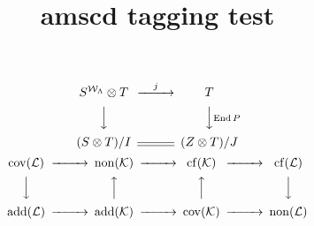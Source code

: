 \documentclass{article}
\title{amscd tagging test}
\DeclareMathOperator{\End}{End}
\DeclareMathOperator{\cov}{cov}
\DeclareMathOperator{\cf}{cf}
\DeclareMathOperator{\add}{add}
\DeclareMathOperator{\non}{non}
\begin{document}
\begin{equation}
\begin{CD}
S^{{\mathcal{W}}_\Lambda}\otimes T @>j>> T\\
@VVV @VV{\End P}V\\
(S\otimes T)/I @= (Z\otimes T)/J
\end{CD}
\end{equation}
\begin{equation}
\begin{CD}
\cov(\mathcal{L}) @>>> \non(\mathcal{K}) @>>> \cf(\mathcal{K}) @>>>
\cf(\mathcal{L})\\
@VVV @AAA @AAA @VVV\\
\add(\mathcal{L}) @>>> \add(\mathcal{K}) @>>> \cov(\mathcal{K}) @>>>
\non(\mathcal{L})
\end{CD}
\end{equation}
\end{document}
